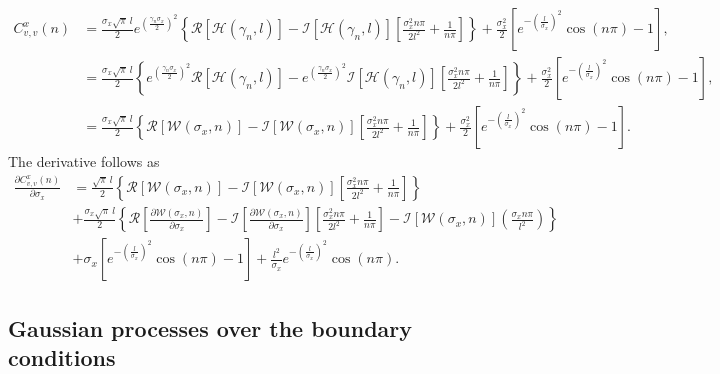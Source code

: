 \documentclass[a4paper,10pt]{article}
\begin{document}
\begin{align*}
C^x_{v,v}(n)
&=\frac{\sigma_x\sqrt{\pi}\,l}{2}e^{\left(\frac{\gamma_n\sigma_x}{2}\right)^2}\left\{\mathcal{R}\left[\mathcal{H}(\gamma_n,l)\right]
-\mathcal{I}\left[\mathcal{H}(\gamma_n,l)\right]\left[\frac{\sigma_x^2n\pi}{2l^2}+\frac{1}{n\pi}\right]\right\}
+\frac{\sigma^2_x}{2}\left[e^{-(\frac{l}{\sigma_x})^2}\cos(n\pi)-1\right],\\
&=\frac{\sigma_x\sqrt{\pi}\,l}{2}\left\{e^{\left(\frac{\gamma_n\sigma_x}{2}\right)^2}\mathcal{R}\left[\mathcal{H}(\gamma_n,l)\right]
-e^{\left(\frac{\gamma_n\sigma_x}{2}\right)^2}\mathcal{I}\left[\mathcal{H}(\gamma_n,l)\right]\left[\frac{\sigma_x^2n\pi}{2l^2}+\frac{1}{n\pi}\right]\right\}
+\frac{\sigma^2_x}{2}\left[e^{-(\frac{l}{\sigma_x})^2}\cos(n\pi)-1\right],\\
&=\frac{\sigma_x\sqrt{\pi}\,l}{2}\left\{\mathcal{R}\left[\mathcal{W}(\sigma_x,n)\right]
-\mathcal{I}\left[\mathcal{W}(\sigma_x,n)\right]\left[\frac{\sigma_x^2n\pi}{2l^2}+\frac{1}{n\pi}\right]\right\}+\frac{\sigma^2_x}{2}\left[e^{-(\frac{l}{\sigma_x})^2}\cos(n\pi)-1\right].
\end{align*}
The derivative follows as
\begin{align*}
\frac{\partial C^x_{v,v}(n)}{\partial \sigma_x}
&=\frac{\sqrt{\pi}\,l}{2}\left\{\mathcal{R}\left[\mathcal{W}(\sigma_x,
  n)\right]
-\mathcal{I}\left[\mathcal{W}(\sigma_x,n)\right]\left[\frac{\sigma_x^2n\pi}{2l^2}+\frac{1}{n\pi}\right]\right\}\\
&+\frac{\sigma_x\sqrt{\pi}\,l}{2}\left\{\mathcal{R}\left[\frac{\partial\mathcal{W}(\sigma_x,
  n)}{\partial \sigma_x}
\right]-\mathcal{I}\left[\frac{\partial\mathcal{W}(\sigma_x, n)}{\partial \sigma_x}\right]
\left[\frac{\sigma_x^2n\pi}{2l^2}+\frac{1}{n\pi}\right]-\mathcal{I}\left[\mathcal{W}(\sigma_x,
  n)
\right]\left(\frac{\sigma_xn\pi}{l^2}\right)\right\}\\
&+\sigma_x\left[e^{-(\frac{l}{\sigma_x})^2}\cos(n\pi)-1\right]+\frac{l^2}{\sigma_x}e^{-(\frac{l}{\sigma_x})^2}\cos(n\pi).
\end{align*}

\subsection*{Gaussian processes over the boundary conditions}
\end{document}
